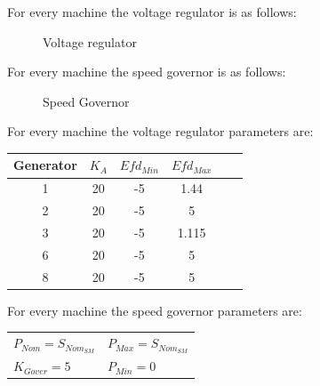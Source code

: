 \documentclass[a4paper, 12pt]{report}
\begin{document}
For every machine the voltage regulator is as follows:
\begin{figure}[H]
\centering
{}
\caption{Voltage regulator}
\end{figure}

For every machine the speed governor is as follows:
\begin{figure}[H]
\centering
{}
\caption{Speed Governor}
\end{figure}

For every machine the voltage regulator parameters are:
\begin{center}
\begin{tabular}{|c|c|c|c|c|c|}
  \hline
  Generator & $K_{A}$  & $Efd_{Min}$ & $Efd_{Max}$\\
  \hline
  1 & 20 & -5 & 1.44\\
  2 & 20 & -5 & 5\\
  3 & 20 & -5 & 1.115\\
  6 & 20 & -5 & 5\\
  8 & 20 & -5 & 5\\
  \hline
\end{tabular}
\end{center}

For every machine the speed governor parameters are:
\begin{center}
\begin{tabular}{l|l}
   $P_{Nom}=S_{Nom_{SM}}$ & $P_{Max}=S_{Nom_{SM}}$  \\
   $K_{Gover}=5$ & $P_{Min}=0$   \\
\end{tabular}
\end{center}
\end{document}
